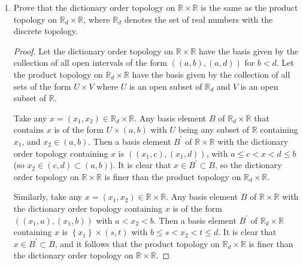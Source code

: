 \documentclass[11pt]{article}
\newcommand{\br}[1]{\left(#1\right)}
\newcommand{\cbr}[1]{\left\{#1\right\}}
\begin{document}
\begin{enumerate}
\begin{proof}
      Then let $\cbr{U_\alpha}$ be an indexed family of nonempty elements (choosing nonempty elements because the union with the empty set does not change cardinality) of $\mathcal{T}$. We have \[X-\bigcup U_\alpha = \bigcap (X-U_\alpha),\] and since each $X-U_\alpha$ is countable by assumption, the intersection is a subset of a countable set, and so $X-\bigcup U_\alpha$ must be countable. Thus $\bigcup U_\alpha$ is in $\mathcal{T}$.

      Then let $U_1, \dots, U_n$ be nonempty elements (nonempty elements chosen because the intersection with the empty set is the empty set) of $\mathcal{T}$. It follows that \[X - \bigcap_{i=1}^n U_i  = \bigcup_{i=1}^n (X-U_i),\] and since each $X-U_i$ is countable by assumption, the finite union $X - \bigcap_{i=1}^n U_i$ must also be countable. Thus $\bigcap_{i=1}^n U_i$ is in $\mathcal{T}$.

      Hence $\mathcal{T}$ is a topological space.
    \end{proof}
    \item Prove that the dictionary order topology on $\mathbb{R}\times \mathbb{R}$ is the same as the product topology on $\mathbb{R}_d\times \mathbb{R}$, where $\mathbb{R}_d$ denotes the set of real numbers with the discrete topology.
    \begin{proof}
      Let the dictionary order topology on $\mathbb{R}\times\mathbb{R}$ have the basis given by the collection of all open intervals of the form $\br{(a,b),(a,d)}$ for $b< d$. Let the product topology on $\mathbb{R}_d\times \mathbb{R}$ have the basis given by the collection of all sets of the form $U\times V$ where $U$ is an open subset of $\mathbb{R}_d$ and $V$ is an open subset of $\mathbb{R}$.

      Take any $x = (x_1,x_2)\in \mathbb{R}_d\times \mathbb{R}$. Any basis element $B$ of $\mathbb{R}_d\times \mathbb{R}$ that contains $x$ is of the form $U\times (a,b)$ with $U$ being any subset of $\mathbb{R}$ containing $x_1$, and $x_2\in (a,b)$. Then a basis element $B^{\prime}$ of $\mathbb{R}\times\mathbb{R}$ with the dictionary order topology containing $x$ is $\br{(x_1,c),(x_1,d)}$, with $a\leq c < x < d \leq b$ (so $x_2\in (c,d)\subset (a,b)$). It is clear that $x\in B^{\prime}\subset B$, so the dictionary order topology on $\mathbb{R}\times \mathbb{R}$ is finer than the product topology on $\mathbb{R}_d\times \mathbb{R}$.

      Similarly, take any $x = (x_1,x_2)\in\mathbb{R}\times\mathbb{R}$. Any basis element $B$ of $\mathbb{R}\times\mathbb{R}$ with the dictionary order topology containing $x$ is of the form $\br{(x_1,a),(x_1,b)}$ with $a<x_2<b$. Then a basis element $B^{\prime}$ of $\mathbb{R}_d\times \mathbb{R}$ containing $x$ is $\cbr{x_1}\times (s,t)$ with $b\leq s < x_2 < t \leq d$. It is clear that $x\in B^{\prime}\subset B$, and it follows that the product topology on $\mathbb{R}_d\times\mathbb{R}$ is finer than the dictionary order topology on $\mathbb{R}\times\mathbb{R}$. 


\end{proof}
\end{enumerate}
\end{document}
